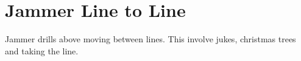 \section{Jammer Line to Line}
Jammer drills above moving between lines.
This involve jukes, christmas trees and taking the line. 
